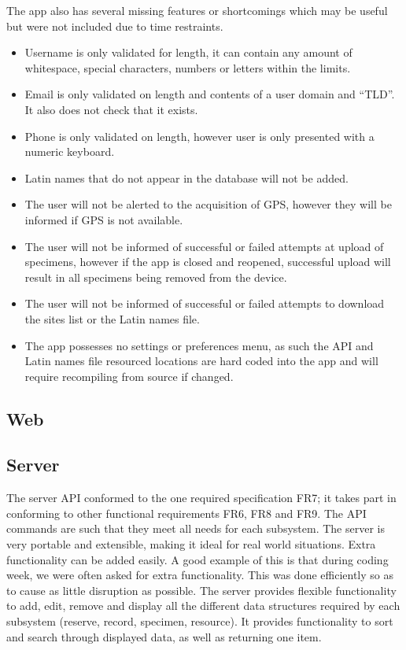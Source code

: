     The app also has several missing features or shortcomings which may be useful but were not included due to time restraints. 
    \begin{itemize}
        \item Username is only validated for length, it can contain any amount of whitespace, special characters, numbers or letters within the limits.
        \item Email is only validated on length and contents of a user domain and ``TLD''. It also does not check that it exists.
        \item Phone is only validated on length, however user is only presented with a numeric keyboard.
        \item Latin names that do not appear in the database will not be added.
        \item The user will not be alerted to the acquisition of GPS, however they will be informed if GPS is not available. 
        \item The user will not be informed of successful or failed attempts at upload of specimens, however if the app is closed and reopened, successful upload will result in all specimens being removed from the device. 
        \item The user will not be informed of successful or failed attempts to download the sites list or the Latin names file.
        \item The app possesses no settings or preferences menu, as such the API and Latin names file resourced locations are hard coded into the app and will require recompiling from source if changed.
    \end{itemize}



\subsection{Web}





\subsection{Server}
 
The server API conformed to the one required specification FR7; it takes part in conforming to other functional requirements FR6, FR8 and FR9. The API commands are such that they meet all needs for each subsystem. The server is very portable and extensible, making it ideal for real world situations. Extra functionality can be added easily. A good example of this is that during coding week, we were often asked for extra functionality. This was done efficiently so as to cause as little disruption as possible. The server provides flexible functionality to add, edit, remove and display all the different data structures required by each subsystem (reserve, record, specimen, resource). It provides functionality to sort and search through displayed data, as well as returning one item. 